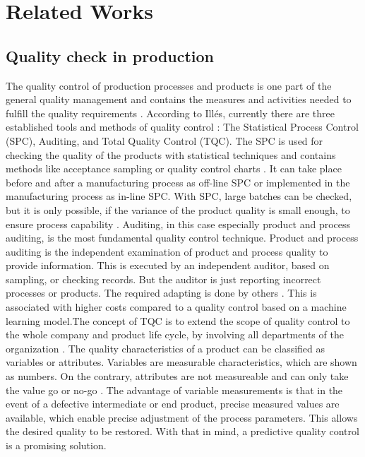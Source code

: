 \documentclass[5p,times,procedia]{elsarticle}
\begin{document}
\section{Related Works} %

\subsection{Quality check in production} %

The quality control of production processes and products is one part of the general quality management
and contains the measures and activities needed to fulfill the quality requirements \cite{illes2017new}.
According to Illés, currently there are three established tools and methods of quality control \cite{illes2017new}:
The Statistical Process Control (SPC), Auditing, and Total Quality Control (TQC).   
The SPC is used for checking the quality of the products with statistical techniques and contains methods like acceptance sampling or
quality control charts \cite{selvamuthu2018introduction}. It can take place before and after a manufacturing process
as off-line SPC or implemented in the manufacturing process as in-line SPC.
With SPC, large batches can be checked, but it is only possible, if the variance of the product quality is small enough,
to ensure process capability \cite{kahle2013zuverlaessigkeitsanalyse}.
Auditing, in this case especially product and process auditing, is the most fundamental quality control technique. 
Product and process auditing is the independent examination of product and process quality to provide information. This is executed by
an independent auditor, based on sampling, or checking records. But the auditor is just reporting incorrect processes or products.
The required adapting is done by others \cite{fox1993quality}. This is associated with higher costs compared to a quality control
based on a machine learning model.The concept of TQC is to extend the scope of quality control to the whole company and product life cycle,
by involving all departments of the organization \cite{illes2017new}.
The quality characteristics of a product can be classified as variables or attributes.
Variables are measurable characteristics, which are shown as numbers. On the contrary,
attributes are not measureable and can only take the value go or no-go \cite{mitra2016fundamentals}. 
The advantage of variable measurements is that in the event of a defective intermediate or end product, 
precise measured values are available, which enable precise adjustment of the process parameters. 
This allows the desired quality to be restored. With that in mind, a predictive quality control is a promising solution.
\end{document}
